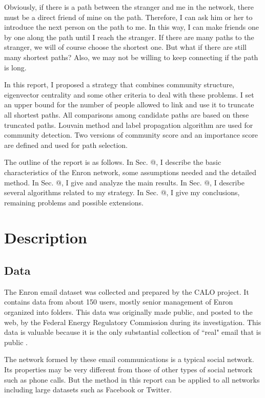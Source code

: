 \documentclass[journal]{IEEEtran}
\makeatletter
\newcommand*{\rom}[1]{\expandafter\@slowromancap\romannumeral #1@}
\makeatother
\begin{document}
Obviously, if there is a path between the stranger and me in the network, there must be a direct friend of mine on the path. Therefore, I can ask him or her to introduce the next person on the path to me. In this way, I can make friends one by one along the path until I reach the stranger. If there are many paths to the stranger, we will of course choose the shortest one. But what if there are still many shortest paths? Also, we may not be willing to keep connecting if the path is long.

In this report, I proposed a strategy that combines community structure, eigenvector centrality and some other criteria to deal with these problems. I set an upper bound for the number of people allowed to link and use it to truncate all shortest paths. All comparisons among candidate paths are based on these truncated paths. Louvain method and label propagation algorithm are used for community detection. Two versions of community score and an importance score are defined and used for path selection.

The outline of the report is as follows. In Sec. \rom{2}, I describe the basic characteristics of the Enron network, some assumptions needed and the detailed method. In Sec. \rom{3}, I give and analyze the main results. In Sec. \rom{4}, I describe several algorithms related to my strategy. In Sec. \rom{5}, I give my conclusions, remaining problems and possible extensions.


\section{Description}
\subsection{Data}
The Enron email dataset \cite{Klimt:2004aa} was collected and prepared by the CALO project. It contains data from about 150 users, mostly senior management of Enron organized into folders. This data was originally made public, and posted to the web, by the Federal Energy Regulatory Commission during its investigation. This data is valuable because it is the only substantial collection of ``real" email that is public \cite{:ac}. 

The network formed by these email communications is a typical social network. Its properties may be very different from those of other types of social network such as phone calls. But the method in this report can be applied to all networks including large datasets such as Facebook or Twitter.
\end{document}
